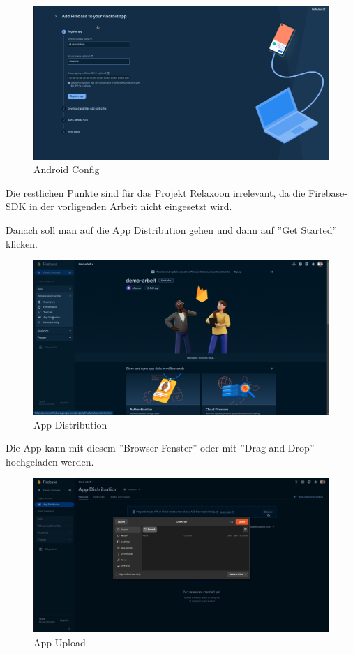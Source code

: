 \begin{figure}[H]

  \includegraphics[width=\textwidth]{./pics/firebase2.png}
  \caption{Android Config}
\end{figure}

Die restlichen Punkte sind für das Projekt Relaxoon irrelevant,
da die Firebase-SDK in der vorligenden Arbeit nicht eingesetzt wird.


Danach soll man auf die App Distribution gehen und dann auf ''Get Started'' klicken.
\begin{figure}[H]
  \includegraphics[width=\textwidth]{./pics/firebase3.png}
  \caption{App Distribution}
\end{figure}

Die App kann mit diesem ''Browser Fenster'' oder mit ''Drag and Drop'' hochgeladen werden.
\begin{figure}[H]
  \includegraphics[width=\textwidth]{./pics/firebase4.png}
  \caption{App Upload}

\end{figure}



